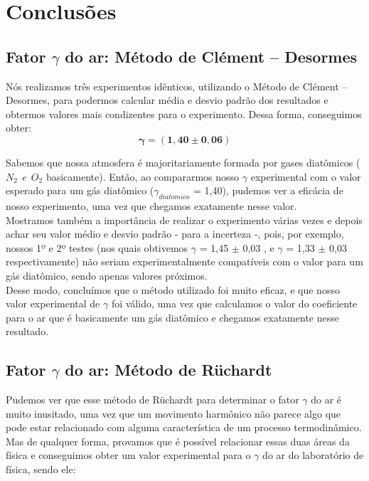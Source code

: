 \newpage
\section{Conclusões}


\subsection{Fator $\gamma$ do ar: Método de Clément – Desormes}

Nós realizamos três experimentos idênticos, utilizando o Método de Clément – Desormes, para podermos calcular média e desvio padrão dos resultados e obtermos valores mais condizentes para o experimento. Dessa forma, conseguimos obter:
\[ \mathbf{\gamma = (1,40 \pm 0,06)} \]

Sabemos que nossa atmosfera é majoritariamente formada por gases diatômicos ($N_2 \ \ e \ \ O_2$ basicamente). Então, ao compararmos nosso $\gamma$ experimental com o valor esperado para um gás diatômico ($\gamma_{diatomico}$ = 1,40), pudemos ver a eficácia de nosso experimento, uma vez que chegamos exatamente nesse valor.\\

Mostramos também a importância de realizar o experimento várias vezes e depois achar seu valor médio e desvio padrão - para a incerteza -, pois, por exemplo, nossos 1º e 2º testes (nos quais obtivemos $\gamma$ = 1,45 $\pm$ 0,03 , e $\gamma$ = 1,33 $\pm$ 0,03 respectivamente) não seriam experimentalmente compatíveis com o valor para um gás diatômico, sendo apenas valores próximos. \\

Desse modo, concluímos que o método utilizado foi muito eficaz, e que nosso valor experimental de $\gamma$ foi válido, uma vez que calculamos o valor do coeficiente para o ar que é basicamente um gás diatômico e chegamos exatamente nesse resultado. 


\subsection{Fator $\gamma$ do ar: Método de Rüchardt}

Pudemos ver que esse método de Rüchardt para determinar o fator $\gamma$ do ar é muito inusitado, uma vez que um movimento harmônico não parece algo que pode estar relacionado com alguma característica de um processo termodinâmico. Mas de qualquer forma, provamos que é possível relacionar essas duas áreas da física e conseguimos obter um valor experimental para o $\gamma$ do ar do laboratório de física, sendo ele:

